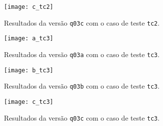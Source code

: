 \begin{figure}[H]
	\begin{center}
		\texttt{[image: c\_tc2]}
		\caption{Resultados da versão \texttt{q03c} com o caso de teste \texttt{tc2}.}
		\label{fig:c_tc2}
	\end{center}
\end{figure}

\begin{figure}[H]
	\begin{center}
		\texttt{[image: a\_tc3]}
		\caption{Resultados da versão \texttt{q03a} com o caso de teste \texttt{tc3}.}
		\label{fig:a_tc3}
	\end{center}
\end{figure}

\begin{figure}[H]
	\begin{center}
		\texttt{[image: b\_tc3]}
		\caption{Resultados da versão \texttt{q03b} com o caso de teste \texttt{tc3}.}
		\label{fig:b_tc3}
	\end{center}
\end{figure}

\begin{figure}[H]
	\begin{center}
		\texttt{[image: c\_tc3]}
		\caption{Resultados da versão \texttt{q03c} com o caso de teste \texttt{tc3}.}
		\label{fig:c_tc3}
	\end{center}
\end{figure}
